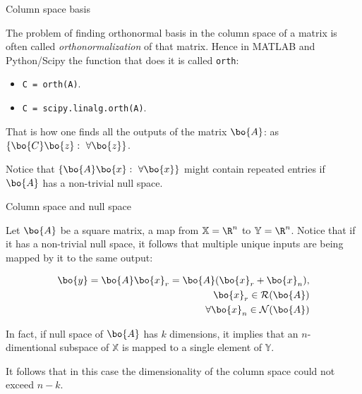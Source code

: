\documentclass{beamer}
\begin{document}
\begin{frame}{Column space basis}
\begin{flushleft}

The problem of finding orthonormal basis in the column space of a matrix is often called \emph{orthonormalization} of that matrix. Hence in MATLAB and Python/Scipy the function that does it is called \texttt{orth}:

\bigskip

\begin{itemize}
    \item \texttt{C = orth(A)}.
    \item \texttt{C = scipy.linalg.orth(A)}.
\end{itemize}

\bigskip

That is how one finds all the outputs of the matrix $\bo{A}$: as $\{ \bo{C}\bo{z}: \ \forall \bo{z} \}$. 

Notice that $\{ \bo{A}\bo{x}: \ \forall \bo{x} \}$ might contain repeated entries if $\bo{A}$ has a non-trivial null space.

\end{flushleft}
\end{frame}



\begin{frame}{Column space and null space}
\begin{flushleft}

Let $\bo{A}$ be a square matrix, a map from $\mathbb{X} = \R^n$ to $\mathbb{Y} = \R^n$. Notice that if it has a non-trivial null space, it follows that multiple unique inputs are being mapped by it to the same output:

\begin{equation}
  \begin{aligned}
    \bo{y} = \bo{A} \bo{x}_r = \bo{A} (\bo{x}_r + \bo{x}_n), \\
    \bo{x}_r \in \mathcal{R}(\bo{A}) \\
    \forall \bo{x}_n \in \mathcal{N}(\bo{A}) \\
  \end{aligned}
\end{equation}

In fact, if null space of $\bo{A}$ has $k$ dimensions, it implies that an $n$-dimentional subspace of $\mathbb{X}$ is mapped to a single element of $\mathbb{Y}$. 

\bigskip

It follows that in this case the dimensionality of the column space could not exceed $n-k$.

\end{flushleft}
\end{frame}
\end{document}
